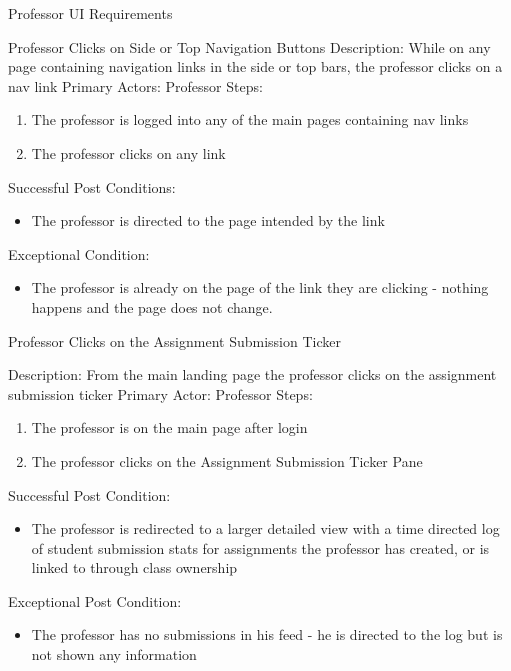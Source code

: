 \documentclass{article}
\begin{document}
\begin{section}{Professor UI Requirements}

\begin{subsection}{Professor Clicks on Side or Top Navigation Buttons}
Description: While on any page containing navigation links in the side or top bars, the professor clicks on a nav link \newline
Primary Actors: Professor \newline
Steps:
\begin{enumerate}
\item{The professor is logged into any of the main pages containing nav links}
\item{The professor clicks on any link}
\end{enumerate}
Successful Post Conditions:
\begin{itemize}
\item{The professor is directed to the page intended by the link}
\end{itemize}
Exceptional Condition:
\begin{itemize}
\item{The professor is already on the page of the link they are clicking - nothing happens and the page does not change.}
\end{itemize}
\end{subsection}

\begin{subsection}{Professor Clicks on the Assignment Submission Ticker}

Description: From the main landing page the professor clicks on the assignment submission ticker \newline 
Primary Actor: Professor \newline
Steps:
\begin{enumerate}
\item{The professor is on the main page after login}
\item{The professor clicks on the Assignment Submission Ticker Pane}
\end{enumerate}
Successful Post Condition:
\begin{itemize}
\item{The professor is redirected to a larger detailed view with a time directed log of student submission stats for assignments the professor has created, or is linked to through class ownership}
\end{itemize}
Exceptional Post Condition:
\begin{itemize}
\item{The professor has no submissions in his feed - he is directed to the log but is not shown any information}
\end{itemize}
\end{subsection}


\end{section}
\end{document}
